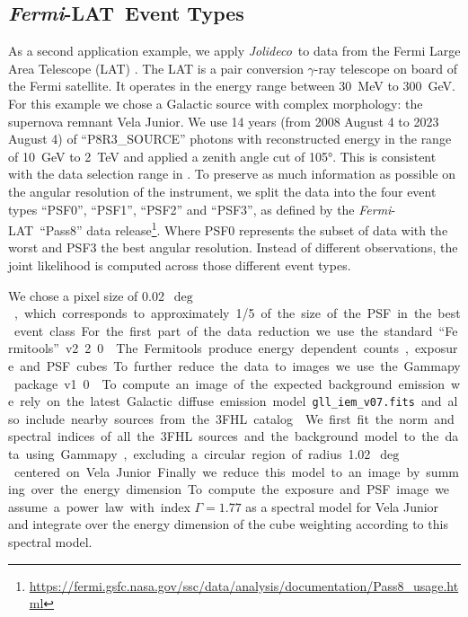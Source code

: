 \documentclass[twocolumn]{aastex631}
\newcommand{\fermi}{\textit{Fermi}-LAT~}
\newcommand{\jolideco}{\textit{Jolideco}~}
\newcommand{\gammaray}{$\gamma$-ray\xspace}
\begin{document}
    \subsection{\fermi Event Types}
    \label{sec:fermi-lat-example}
     As a second application example, we apply \jolideco  to data from the Fermi Large Area Telescope (LAT) \citep{Atwood2009}. The LAT is a pair conversion \gammaray telescope on board of the Fermi satellite. It operates in the energy range between \qty[mode = text]{30}{MeV} to  \qty[mode = text]{300}{GeV}. For this example we chose  a Galactic source with complex morphology: the supernova remnant Vela Junior. We use 14 years (from 2008 August 4 to 2023 August 4) of \enquote{P8R3\_SOURCE} photons with reconstructed energy in the range of \qty[mode = text]{10}{GeV} to \qty[mode = text]{2}{TeV} and applied a zenith angle cut of \ang{105}. This is consistent with the data selection range in \cite{Ackermann2017}. To preserve as much information as possible on the angular resolution of the instrument, we split the data into the four event types \enquote{PSF0}, \enquote{PSF1}, \enquote{PSF2} and \enquote{PSF3}, as defined by the \fermi \enquote{Pass8} data release\footnote{\url{https://fermi.gsfc.nasa.gov/ssc/data/analysis/documentation/Pass8_usage.html}}. Where PSF0 represents the subset of data with the worst and PSF3 the best angular resolution. Instead of different observations, the joint likelihood is computed across those different event types.
     
     We chose a pixel size of \qty[mode = text]{0.02}{$\deg$}, which corresponds to approximately 1/5 of the size of the PSF in the best event class. For the first part of the data reduction we use the standard \enquote{Fermitools} v2.2.0 \citep{Fermitools2019}.
    
    The Fermitools produce energy dependent counts, exposure and PSF cubes. To further reduce the data to images we use the Gammapy package v1.0 \citep{GammapyZenodov1.0.1, Gammapy2023}. To compute an image of the expected background emission we rely on the latest Galactic diffuse emission model \texttt{gll\_iem\_v07.fits} and also include nearby sources from the 3FHL catalog \citep{Ajello2017}. We first fit the norm and spectral indices of all the 3FHL sources and the background model to the data using Gammapy, excluding a circular region of radius \qty[mode = text]{1.02}{$\deg$} centered on Vela Junior. Finally we reduce this model to an image by summing over the energy dimension. To compute the exposure and PSF image we assume a power law with index $\Gamma=1.77$ \citep{Ajello2017} as a spectral model for Vela Junior and integrate over the energy dimension of the cube weighting according to this spectral model.
    
\end{document}
